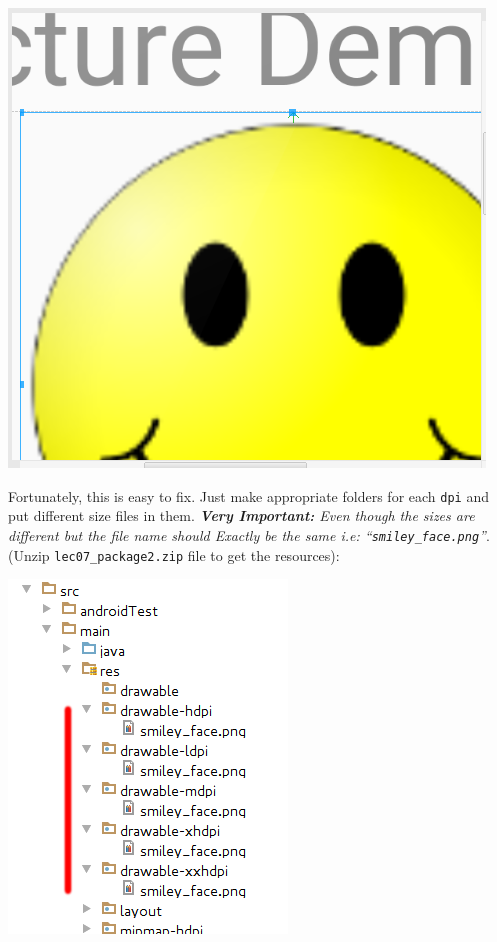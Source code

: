 \begin{center}
	\includegraphics[scale=0.6]{chapters/ch06/images/10}
\end{center}

Fortunately, this is easy to fix. Just make appropriate folders for each \texttt{dpi} and put different size files in them. \textit{\textbf{Very Important:} Even though the sizes are different but the file name should Exactly be the same i.e: ``\texttt{smiley\_face.png}''}. (Unzip \texttt{lec07\_package2.zip} file to get the resources):

\begin{center}
	\includegraphics[scale=0.4]{chapters/ch06/images/11}
\end{center}

